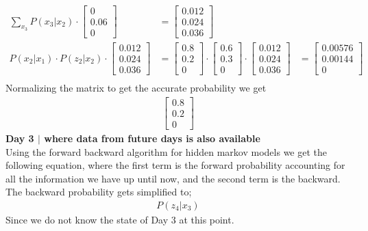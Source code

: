 \documentclass[answers]{exam}
\begin{document}
\begin{questions}
\begin{parts}
\begin{solution}
\begin{align*}
                \sum_{x_3} P(x_3 | x_2) \cdot \begin{bmatrix} 0 \\ 0.06 \\ 0 \end{bmatrix}                      & = \begin{bmatrix} 0.012 \\ 0.024 \\ 0.036 \end{bmatrix}                                                                                                                                                                   \\
                P(x_{2} | x_1) \cdot P(z_{2} | x_2) \cdot \begin{bmatrix} 0.012 \\ 0.024 \\ 0.036 \end{bmatrix} & = \begin{bmatrix} 0.8 \\ 0.2 \\ 0 \end{bmatrix} \cdot \begin{bmatrix} 0.6 \\ 0.3 \\ 0 \end{bmatrix} \cdot \begin{bmatrix} 0.012 \\ 0.024 \\ 0.036 \end{bmatrix} & = \begin{bmatrix} 0.00576 \\ 0.00144 \\ 0 \end{bmatrix} \\
            \end{align*}
            Normalizing the matrix to get the accurate probability we get
            \begin{align*}
                \begin{bmatrix} 0.8 \\ 0.2 \\ 0 \end{bmatrix}
            \end{align*}
            \textbf{Day 3 $\mid$ where data from future days is also available \\}
            Using the forward backward algorithm for hidden markov models we get the following equation, where the first term is the forward probability accounting for all the information we have up until now, and the second term is the backward. The backward probability gets simplified to;
            \begin{align*}
                P(z_4 | x_3)
            \end{align*}
            Since we do not know the state of Day 3 at this point.


\end{solution}
\end{parts}
\end{questions}
\end{document}
